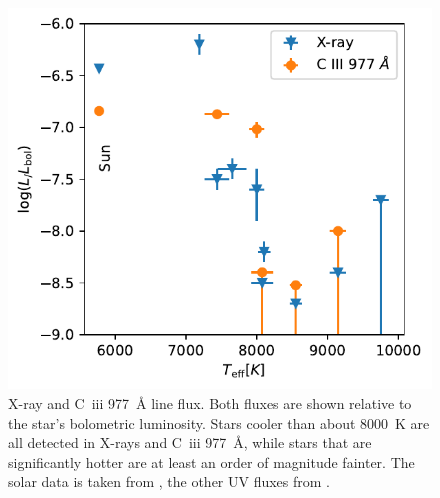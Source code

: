 \documentclass[linenumbers]{aastex631}
\begin{document}
\begin{figure}
    \centering
    \includegraphics[width=\textwidth]{lc3lxlbol}
    \caption{X-ray and C~{\sc iii} 977~\AA{} line flux. Both fluxes are shown relative to the star's bolometric luminosity. Stars cooler than about 8000~K are all detected in X-rays and  C~{\sc iii} 977~\AA{}, while stars that are significantly hotter are at least an order of magnitude fainter.
The solar data is taken from \citep{1997JGR...102.1641A}, the other UV fluxes from \citet{2002ApJ...579..800S}. } \label{fig:lc3lxlbol}
\end{figure}
\end{document}
